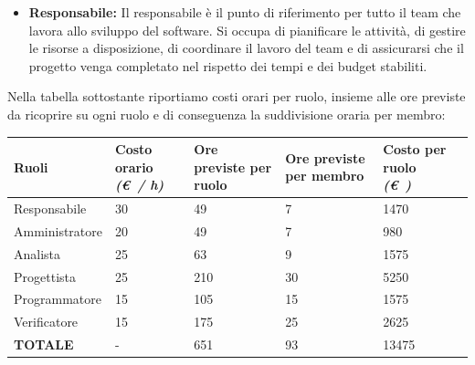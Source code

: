 \documentclass{article}
\begin{document}
\begin{itemize}
\begin{itemize}
        \item \textbf{Responsabile:} Il responsabile è il punto di riferimento per tutto il team che lavora allo sviluppo del software. Si occupa di pianificare le attività, di gestire le risorse a disposizione, di coordinare il lavoro del team e di assicurarsi che il progetto venga completato nel rispetto dei tempi e dei budget stabiliti.
    \end{itemize}
    \pagebreak
    Nella tabella sottostante riportiamo costi orari per ruolo, insieme alle ore previste da ricoprire su ogni ruolo e di conseguenza la suddivisione oraria per membro:
    \vspace{0.5cm}
    \begin{center}
        
    \begin{tabular}{|C{3cm}|C{2cm}|C{2cm}|C{2cm}|C{2cm}|C{2cm}|}
        \hline

        \textbf{Ruoli} & \textbf{Costo orario} \linebreak \textit{(\euro\ / h)} & \textbf{Ore previste per ruolo} & \textbf{Ore previste per membro} & \textbf{Costo per ruolo} \linebreak \textit{(\euro\ )} \\
        \hline\hline
        
        Responsabile & 30 & 49 & 7 & 1470 \\
        \hline
        
        Amministratore & 20 & 49 & 7 & 980 \\
        \hline
        
        Analista & 25 & 63 & 9 & 1575 \\
        \hline 
        
        Progettista & 25 & 210 & 30 & 5250 \\ 
        \hline
        
        Programmatore & 15 & 105 & 15 & 1575 \\
        \hline
        
        Verificatore & 15 & 175 & 25 & 2625 \\
        \hline\hline
        
        \textbf{TOTALE} & - & 651 & 93 & 13475 \\
        \hline
    \end{tabular}
    \end{center}

    
    \vspace{0.5cm}


\end{itemize}
\end{document}
